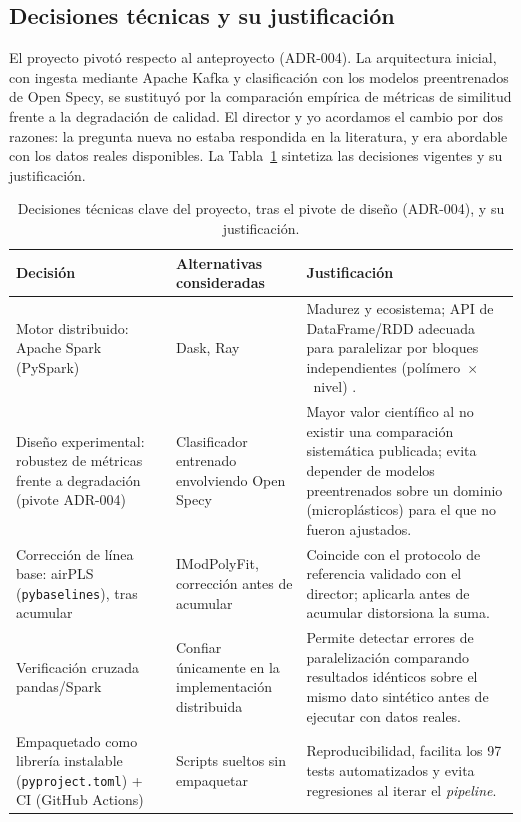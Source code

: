 \subsection{Decisiones técnicas y su justificación}

El proyecto pivotó respecto al anteproyecto (ADR-004). La arquitectura inicial, con ingesta mediante Apache Kafka y clasificación con los modelos preentrenados de Open Specy, se sustituyó por la comparación empírica de métricas de similitud frente a la degradación de calidad. El director y yo acordamos el cambio por dos razones: la pregunta nueva no estaba respondida en la literatura, y era abordable con los datos reales disponibles. La Tabla~\ref{tab:decisiones} sintetiza las decisiones vigentes y su justificación.

\begin{table}[H]
  \centering
  \small
  \begin{tabular}{@{}p{}p{}p{}@{}}
    \toprule
    \textbf{Decisión} & \textbf{Alternativas consideradas} & \textbf{Justificación} \\
    \midrule
    Motor distribuido: Apache Spark (PySpark) & Dask, Ray & Madurez y ecosistema; API de DataFrame/RDD adecuada para paralelizar por bloques independientes (polímero~$\times$~nivel) \citep{zaharia2010spark, zaharia2016spark, armbrust2015sparksql}. \\
    \addlinespace
    Diseño experimental: robustez de métricas frente a degradación (pivote ADR-004) & Clasificador entrenado envolviendo Open Specy & Mayor valor científico al no existir una comparación sistemática publicada; evita depender de modelos preentrenados sobre un dominio (microplásticos) para el que no fueron ajustados. \\
    \addlinespace
    Corrección de línea base: airPLS (\texttt{pybaselines}), tras acumular & IModPolyFit, corrección antes de acumular & Coincide con el protocolo de referencia validado con el director; aplicarla antes de acumular distorsiona la suma. \\
    \addlinespace
    Verificación cruzada pandas/Spark & Confiar únicamente en la implementación distribuida & Permite detectar errores de paralelización comparando resultados idénticos sobre el mismo dato sintético antes de ejecutar con datos reales. \\
    \addlinespace
    Empaquetado como librería instalable (\texttt{pyproject.toml}) + CI (GitHub Actions) & Scripts sueltos sin empaquetar & Reproducibilidad, facilita los 97 tests automatizados y evita regresiones al iterar el \textit{pipeline}. \\
    \bottomrule
  \end{tabular}
  \caption{Decisiones técnicas clave del proyecto, tras el pivote de diseño (ADR-004), y su justificación.}
  \label{tab:decisiones}
\end{table}

